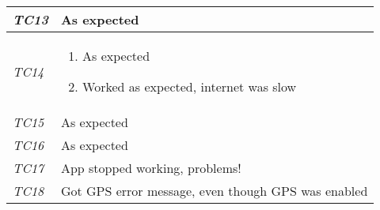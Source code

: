 \begin{minipage}{\linewidth}
\begin{tabular}{ |l|p{70mm}| }
	\it{\cellcolor{gray!25}TC13} & As expected \\ \hline
	\it{\cellcolor{gray!25}TC14} & \begin{enumerate}[label=\alph*)]
	                                 \item As expected
	                                 \item Worked as expected, internet was slow
	                               \end{enumerate}\\ \hline
	\it{\cellcolor{gray!25}TC15} & As expected \\ \hline
	\it{\cellcolor{gray!25}TC16} & As expected \\ \hline
	\it{\cellcolor{gray!25}TC17} & App stopped working, problems! \\ \hline
	\it{\cellcolor{gray!25}TC18} & Got GPS error message, even though GPS was enabled \\ \hline
\end{tabular}
\medskip
\end{minipage}
%
